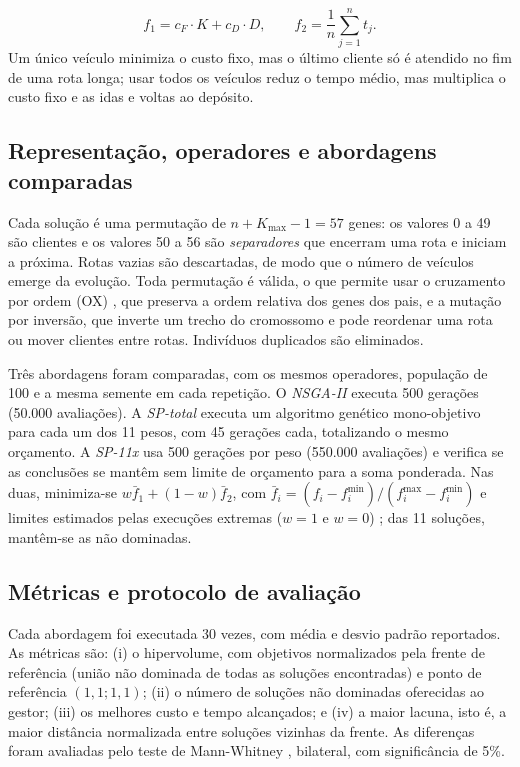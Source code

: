 \documentclass[a4paper,12pt]{article}
\begin{document}
\begin{equation}
f_1 = c_F \cdot K + c_D \cdot D, \qquad f_2 = \frac{1}{n}\sum_{j=1}^{n} t_j.
\label{eq:obj}
\end{equation}
Um único veículo minimiza o custo fixo, mas o último cliente só é atendido no fim de uma rota longa; usar todos os veículos reduz o tempo médio, mas multiplica o custo fixo e as idas e voltas ao depósito.


\subsection{Representação, operadores e abordagens comparadas}\label{sec:repr}
\noindent Cada solução é uma permutação de $n + K_{\max} - 1 = 57$ genes: os valores 0 a 49 são clientes e os valores 50 a 56 são \emph{separadores} que encerram uma rota e iniciam a próxima. Rotas vazias são descartadas, de modo que o número de veículos emerge da evolução. Toda permutação é válida, o que permite usar o cruzamento por ordem (OX) \citep{davis1985}, que preserva a ordem relativa dos genes dos pais, e a mutação por inversão, que inverte um trecho do cromossomo e pode reordenar uma rota ou mover clientes entre rotas. Indivíduos duplicados são eliminados.

Três abordagens foram comparadas, com os mesmos operadores, população de 100 e a mesma semente em cada repetição. O \emph{NSGA-II} executa 500 gerações (50.000 avaliações). A \emph{SP-total} executa um algoritmo genético mono-objetivo para cada um dos 11 pesos, com 45 gerações cada, totalizando o mesmo orçamento. A \emph{SP-11x} usa 500 gerações por peso (550.000 avaliações) e verifica se as conclusões se mantêm sem limite de orçamento para a soma ponderada. Nas duas, minimiza-se $w \bar{f}_1 + (1-w)\bar{f}_2$, com $\bar{f}_i = (f_i - f_i^{\min})/(f_i^{\max} - f_i^{\min})$ e limites estimados pelas execuções extremas ($w = 1$ e $w = 0$) \citep{marler2004}; das 11 soluções, mantêm-se as não dominadas.


\subsection{Métricas e protocolo de avaliação}\label{sec:metricas}
\noindent Cada abordagem foi executada 30 vezes, com média e desvio padrão reportados. As métricas são: (i) o hipervolume, com objetivos normalizados pela frente de referência (união não dominada de todas as soluções encontradas) e ponto de referência $(1{,}1; 1{,}1)$; (ii) o número de soluções não dominadas oferecidas ao gestor; (iii) os melhores custo e tempo alcançados; e (iv) a maior lacuna, isto é, a maior distância normalizada entre soluções vizinhas da frente. As diferenças foram avaliadas pelo teste de Mann-Whitney \citep{mann1947}, bilateral, com significância de 5\%.
\end{document}

